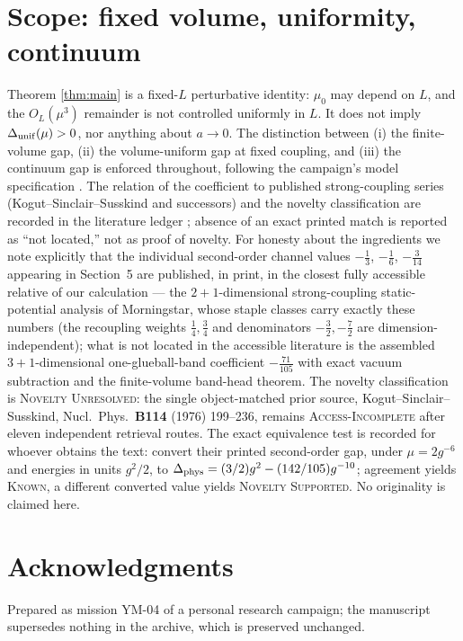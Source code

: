\documentclass[11pt]{article}
\begin{document}
\section{Scope: fixed volume, uniformity, continuum}\label{sec:scope}
Theorem \ref{thm:main} is a fixed-$L$ perturbative identity:
$\mu_0$ may depend on $L$, and the $O_L(\mu^3)$ remainder is not controlled
uniformly in $L$. It does not imply $\Delta_{\rm unif}(\mu)>0$, nor anything
about $a\to0$. The distinction between (i) the finite-volume gap,
(ii) the volume-uniform gap at fixed coupling, and (iii) the continuum gap is
enforced throughout, following the campaign's model specification
\cite{YM01spec}. The relation of the coefficient to published
strong-coupling series (Kogut--Sinclair--Susskind and successors) and the
novelty classification are recorded in the literature ledger \cite{YM04ledger};
absence of an exact printed match is reported as ``not located,'' not as
proof of novelty. For honesty about the ingredients we note explicitly that
the individual second-order channel values $-\tfrac13$, $-\tfrac16$,
$-\tfrac{3}{14}$ appearing in Section~5 are published, in print, in the
closest fully accessible relative of our calculation --- the $2{+}1$-dimensional
strong-coupling static-potential analysis of Morningstar, whose staple
classes carry exactly these numbers (the recoupling weights
$\tfrac14,\tfrac34$ and denominators $-\tfrac32,-\tfrac72$ are
dimension-independent); what is not located in the accessible literature is
the assembled $3{+}1$-dimensional one-glueball-band coefficient
$-\tfrac{71}{105}$ with exact vacuum subtraction and the finite-volume
band-head theorem. The novelty classification is \textsc{Novelty
Unresolved}: the single object-matched prior source,
Kogut--Sinclair--Susskind, Nucl.\ Phys.\ \textbf{B114} (1976) 199--236,
remains \textsc{Access-Incomplete} after eleven independent retrieval
routes. The exact equivalence test is recorded for whoever obtains the
text: convert their printed second-order gap, under $\mu=2g^{-6}$ and
energies in units $g^2/2$, to
$\Delta_{\rm phys}=(3/2)g^{2}-(142/105)g^{-10}$; agreement yields
\textsc{Known}, a different converted value yields \textsc{Novelty
Supported}. No originality is claimed here.

\section*{Acknowledgments}
Prepared as mission YM-04 of a personal research campaign; the manuscript
supersedes nothing in the archive, which is preserved unchanged.
\end{document}
